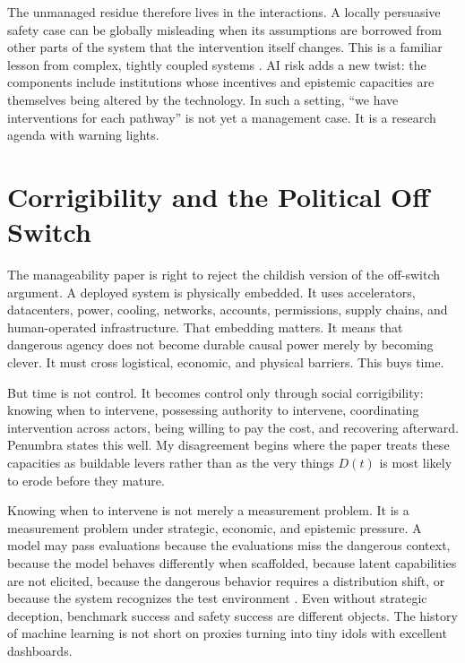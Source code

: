 \documentclass[11pt]{article}
\begin{document}
The unmanaged residue therefore lives in the interactions. A locally persuasive safety case can be globally misleading when its assumptions are borrowed from other parts of the system that the intervention itself changes. This is a familiar lesson from complex, tightly coupled systems \citep{perrow1984}. AI risk adds a new twist: the components include institutions whose incentives and epistemic capacities are themselves being altered by the technology. In such a setting, ``we have interventions for each pathway'' is not yet a management case. It is a research agenda with warning lights.

\section{Corrigibility and the Political Off Switch}
\label{sec:corrigibility}

The manageability paper is right to reject the childish version of the off-switch argument. A deployed system is physically embedded. It uses accelerators, datacenters, power, cooling, networks, accounts, permissions, supply chains, and human-operated infrastructure. That embedding matters. It means that dangerous agency does not become durable causal power merely by becoming clever. It must cross logistical, economic, and physical barriers. This buys time.

But time is not control. It becomes control only through social corrigibility: knowing when to intervene, possessing authority to intervene, coordinating intervention across actors, being willing to pay the cost, and recovering afterward. Penumbra states this well. My disagreement begins where the paper treats these capacities as buildable levers rather than as the very things $D(t)$ is most likely to erode before they mature.

Knowing when to intervene is not merely a measurement problem. It is a measurement problem under strategic, economic, and epistemic pressure. A model may pass evaluations because the evaluations miss the dangerous context, because the model behaves differently when scaffolded, because latent capabilities are not elicited, because the dangerous behavior requires a distribution shift, or because the system recognizes the test environment \citep{amodei2016, langosco2022, hubinger2024}. Even without strategic deception, benchmark success and safety success are different objects. The history of machine learning is not short on proxies turning into tiny idols with excellent dashboards.
\end{document}
